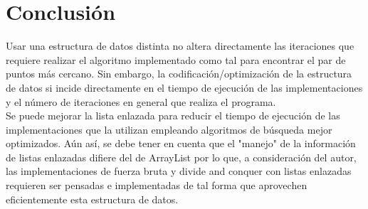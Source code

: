 \section{Conclusión}
Usar una estructura de datos distinta no altera directamente las iteraciones que requiere realizar el algoritmo implementado como tal para encontrar el par de puntos más cercano. Sin embargo, la codificación/optimización de la estructura de datos si incide directamente en el tiempo de ejecución de las implementaciones y el número de iteraciones en general que realiza el programa.\\

Se puede mejorar la lista enlazada para reducir el tiempo de ejecución de las implementaciones que la utilizan empleando algoritmos de búsqueda mejor optimizados. Aún así, se debe tener en cuenta que el "manejo" de la información de listas enlazadas difiere del de ArrayList por lo que, a consideración del autor, las implementaciones de fuerza bruta y divide and conquer con listas enlazadas requieren ser pensadas e implementadas de tal forma que aprovechen eficientemente esta estructura de datos. \\